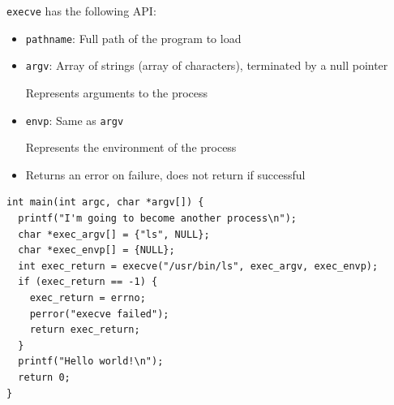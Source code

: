   \begin{slide}


    \texttt{execve} has the following API:
    \begin{itemize}
      \item \texttt{pathname}: Full path of the program to load
      \item \texttt{argv}: Array of strings (array of characters), terminated by
             a null pointer

            \leftspace{}Represents arguments to the process
      \item \texttt{envp}: Same as \texttt{argv}

            \leftspace{}Represents the environment of the process
      \item Returns an error on failure, does not return if successful
    \end{itemize}
  \end{slide}

  \begin{slide}


    \begin{verbatim}
int main(int argc, char *argv[]) {
  printf("I'm going to become another process\n"); 
  char *exec_argv[] = {"ls", NULL};
  char *exec_envp[] = {NULL};
  int exec_return = execve("/usr/bin/ls", exec_argv, exec_envp);
  if (exec_return == -1) {
    exec_return = errno;
    perror("execve failed");
    return exec_return;
  }
  printf("Hello world!\n");
  return 0;
}
    \end{verbatim}
  \end{slide}

 


